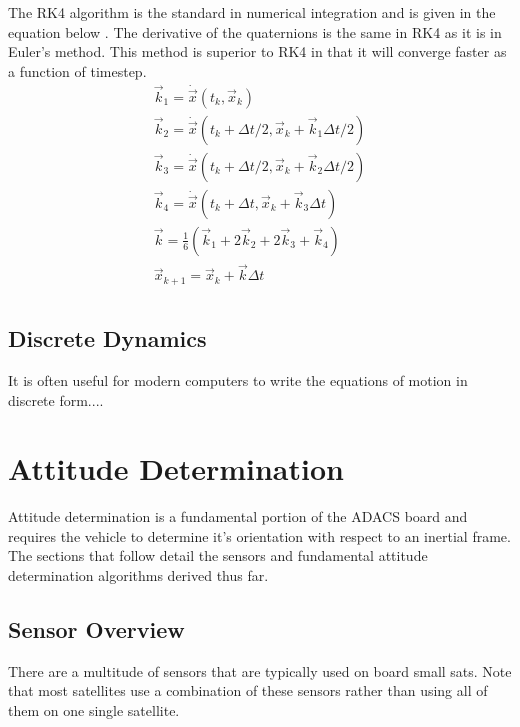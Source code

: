 \documentclass{article}
\begin{document}
The RK4 algorithm is the standard in numerical integration and is
given in the equation below \cite{Chapra_MEANALYSIS}. The derivative
of the quaternions is the same in RK4 as it is in Euler's method. This
method is superior to RK4 in that it will converge faster as a
function of timestep.
\begin{equation}
  \begin{matrix}
    \vec{k}_1 = \dot{\vec{x}}(t_k,\vec{x}_k)\\
    \vec{k}_2 = \dot{\vec{x}}(t_k+\Delta t/2,\vec{x}_k+\vec{k}_1\Delta t/2)\\
    \vec{k}_3 = \dot{\vec{x}}(t_k+\Delta t/2,\vec{x}_k+\vec{k}_2\Delta t/2)\\
    \vec{k}_4 = \dot{\vec{x}}(t_k+\Delta t,\vec{x}_k+\vec{k}_3\Delta t)\\
    \vec{k} = \frac{1}{6}(\vec{k}_1 + 2\vec{k}_2 + 2\vec{k}_3 + \vec{k}_4)\\
    \vec{x}_{k+1} = \vec{x}_k + \vec{k} \Delta t \\
  \end{matrix}
\end{equation}

\subsection{Discrete Dynamics}

It is often useful for modern computers to write the equations of
motion in discrete form....

\section{Attitude Determination}

Attitude determination is a fundamental portion of the ADACS board and
requires the vehicle to determine it's orientation with respect to an
inertial frame. The sections that follow detail the sensors and
fundamental attitude determination algorithms derived thus far. 

\subsection{Sensor Overview}

There are a multitude of sensors that are typically used on board
small sats. Note that most satellites use a combination of these
sensors rather than using all of them on one single satellite.
\end{document}
